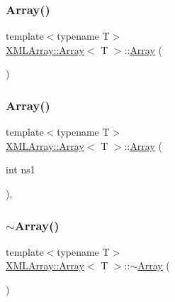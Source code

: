 \subsubsection{\texorpdfstring{Array()}{Array()}\hspace{0.1cm}{\footnotesize\ttfamily [1/6]}}
{\footnotesize\ttfamily template$<$typename T$>$ \\
\mbox{\hyperlink{classXMLArray_1_1Array}{X\+M\+L\+Array\+::\+Array}}$<$ T $>$\+::\mbox{\hyperlink{classXMLArray_1_1Array}{Array}} (\begin{DoxyParamCaption}{ }\end{DoxyParamCaption})\hspace{0.3cm}{\ttfamily [inline]}}

\mbox{\label{classXMLArray_1_1Array_ae2ff376197c96aa965c9b04297b013cd}} 
\subsubsection{\texorpdfstring{Array()}{Array()}\hspace{0.1cm}{\footnotesize\ttfamily [2/6]}}
{\footnotesize\ttfamily template$<$typename T$>$ \\
\mbox{\hyperlink{classXMLArray_1_1Array}{X\+M\+L\+Array\+::\+Array}}$<$ T $>$\+::\mbox{\hyperlink{classXMLArray_1_1Array}{Array}} (\begin{DoxyParamCaption}\item[{int}]{ns1 }\end{DoxyParamCaption})\hspace{0.3cm}{\ttfamily [inline]}, {\ttfamily [explicit]}}

\mbox{\label{classXMLArray_1_1Array_ae344c6bdb93a8e4e2b5b42fda7abf94d}} 
\subsubsection{\texorpdfstring{$\sim$Array()}{~Array()}\hspace{0.1cm}{\footnotesize\ttfamily [1/2]}}
{\footnotesize\ttfamily template$<$typename T$>$ \\
\mbox{\hyperlink{classXMLArray_1_1Array}{X\+M\+L\+Array\+::\+Array}}$<$ T $>$\+::$\sim$\mbox{\hyperlink{classXMLArray_1_1Array}{Array}} (\begin{DoxyParamCaption}{ }\end{DoxyParamCaption})\hspace{0.3cm}{\ttfamily [inline]}}


